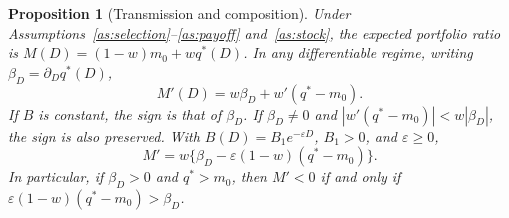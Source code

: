 \documentclass[11pt]{article}
\newtheorem{proposition}{Proposition}
\theoremstyle{definition}\newtheorem{assumption}{Assumption}
\begin{document}
\begin{proposition}[Transmission and composition]\label{p:stock}
Under Assumptions~\ref{as:selection}--\ref{as:payoff} and~\ref{as:stock},
the expected portfolio ratio is $M(D)=(1-w)m_0+wq^*(D)$. In any differentiable
regime, writing $\beta_D=\partial_Dq^*(D)$,
\begin{equation}\label{eq:stock}
M'(D)=w\beta_D+w'(q^*-m_0).
\end{equation}
If $B$ is constant, the sign is that of $\beta_D$. If $\beta_D\ne0$ and
$|w'(q^*-m_0)|<w|\beta_D|$, the sign is also preserved.
With $B(D)=B_1e^{-\varepsilon D}$, $B_1>0$, and $\varepsilon\ge0$,
\begin{equation}\label{eq:composition}
M'=w\{\beta_D-\varepsilon(1-w)(q^*-m_0)\}.
\end{equation}
In particular, if $\beta_D>0$ and $q^*>m_0$, then $M'<0$ if and only if
$\varepsilon(1-w)(q^*-m_0)>\beta_D$.
\end{proposition}
\end{document}
